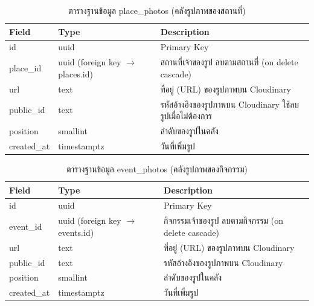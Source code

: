 \begin{table}[H]
\centering
\caption{ตารางฐานข้อมูล place\_photos (คลังรูปภาพของสถานที่)}
\label{tab:db_pphotos}
\begin{tabular}{|p{3.6cm}|p{2.6cm}|p{6.8cm}|}
\hline
\textbf{Field} & \textbf{Type} & \textbf{Description} \\
\hline
id & uuid & Primary Key \\ \hline
place\_id & uuid (foreign key $\to$ places.id) & สถานที่เจ้าของรูป ลบตามสถานที่ (on delete cascade) \\ \hline
url & text & ที่อยู่ (URL) ของรูปภาพบน Cloudinary \\ \hline
public\_id & text & รหัสอ้างอิงของรูปภาพบน Cloudinary ใช้ลบรูปเมื่อไม่ต้องการ \\ \hline
position & smallint & ลำดับของรูปในคลัง \\ \hline
created\_at & timestamptz & วันที่เพิ่มรูป \\
\hline
\end{tabular}
\end{table}

\begin{table}[H]
\centering
\caption{ตารางฐานข้อมูล event\_photos (คลังรูปภาพของกิจกรรม)}
\label{tab:db_ephotos}
\begin{tabular}{|p{3.6cm}|p{2.6cm}|p{6.8cm}|}
\hline
\textbf{Field} & \textbf{Type} & \textbf{Description} \\
\hline
id & uuid & Primary Key \\ \hline
event\_id & uuid (foreign key $\to$ events.id) & กิจกรรมเจ้าของรูป ลบตามกิจกรรม (on delete cascade) \\ \hline
url & text & ที่อยู่ (URL) ของรูปภาพบน Cloudinary \\ \hline
public\_id & text & รหัสอ้างอิงของรูปภาพบน Cloudinary \\ \hline
position & smallint & ลำดับของรูปในคลัง \\ \hline
created\_at & timestamptz & วันที่เพิ่มรูป \\
\hline
\end{tabular}
\end{table}

